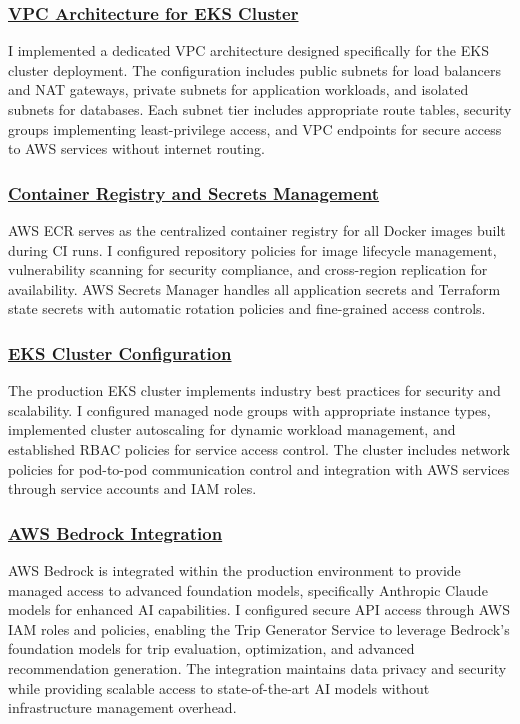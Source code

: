 \subsubsection*{\underline{VPC Architecture for EKS Cluster}}
I implemented a dedicated VPC architecture designed specifically for the EKS cluster deployment. The configuration includes public subnets for load balancers and NAT gateways, private subnets for application workloads, and isolated subnets for databases. Each subnet tier includes appropriate route tables, security groups implementing least-privilege access, and VPC endpoints for secure access to AWS services without internet routing.

\subsubsection*{\underline{Container Registry and Secrets Management}}
AWS ECR serves as the centralized container registry for all Docker images built during CI runs. I configured repository policies for image lifecycle management, vulnerability scanning for security compliance, and cross-region replication for availability. AWS Secrets Manager handles all application secrets and Terraform state secrets with automatic rotation policies and fine-grained access controls.

\subsubsection*{\underline{EKS Cluster Configuration}}
The production EKS cluster implements industry best practices for security and scalability. I configured managed node groups with appropriate instance types, implemented cluster autoscaling for dynamic workload management, and established RBAC policies for service access control. The cluster includes network policies for pod-to-pod communication control and integration with AWS services through service accounts and IAM roles.

\subsubsection*{\underline{AWS Bedrock Integration}}
AWS Bedrock is integrated within the production environment to provide managed access to advanced foundation models, specifically Anthropic Claude models for enhanced AI capabilities. I configured secure API access through AWS IAM roles and policies, enabling the Trip Generator Service to leverage Bedrock's foundation models for trip evaluation, optimization, and advanced recommendation generation. The integration maintains data privacy and security while providing scalable access to state-of-the-art AI models without infrastructure management overhead.


